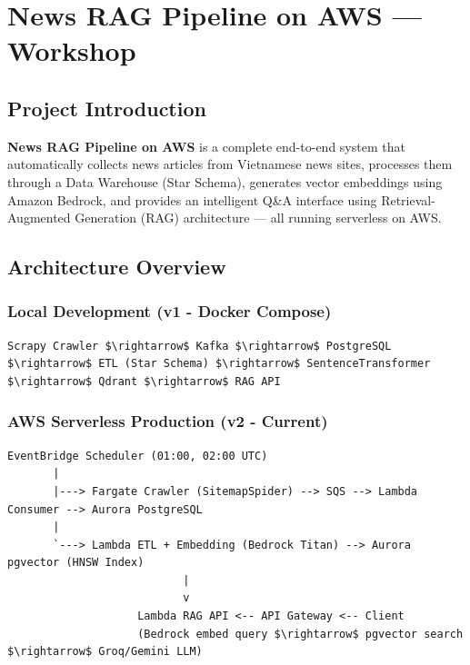 \hypertarget{news-rag-pipeline-on-aws-workshop}{%
\section{News RAG Pipeline on AWS ---
Workshop}}

\hypertarget{project-introduction}{%
\subsection{Project Introduction}}

\textbf{News RAG Pipeline on AWS} is a complete end-to-end system that
automatically collects news articles from Vietnamese news sites,
processes them through a Data Warehouse (Star Schema), generates vector
embeddings using Amazon Bedrock, and provides an intelligent Q\&A
interface using Retrieval-Augmented Generation (RAG) architecture ---
all running serverless on AWS.

\hypertarget{architecture-overview}{%
\subsection{Architecture Overview}}

\hypertarget{local-development-v1---docker-compose}{%
\subsubsection{Local Development (v1 - Docker
Compose)}}

\begin{verbatim}
Scrapy Crawler $\rightarrow$ Kafka $\rightarrow$ PostgreSQL $\rightarrow$ ETL (Star Schema) $\rightarrow$ SentenceTransformer $\rightarrow$ Qdrant $\rightarrow$ RAG API
\end{verbatim}

\hypertarget{aws-serverless-production-v2---current}{%
\subsubsection{AWS Serverless Production (v2 -
Current)}}

\begin{verbatim}
EventBridge Scheduler (01:00, 02:00 UTC)
       |
       |---> Fargate Crawler (SitemapSpider) --> SQS --> Lambda Consumer --> Aurora PostgreSQL
       |
       `---> Lambda ETL + Embedding (Bedrock Titan) --> Aurora pgvector (HNSW Index)
                           |
                           v
                    Lambda RAG API <-- API Gateway <-- Client
                    (Bedrock embed query $\rightarrow$ pgvector search $\rightarrow$ Groq/Gemini LLM)
\end{verbatim}

